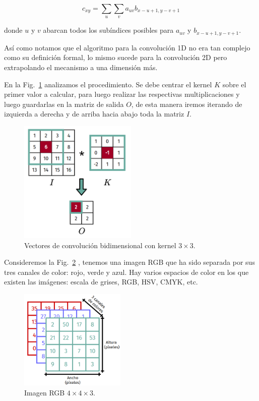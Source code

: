 \documentclass[a4paper,12pt]{article}
\begin{document}
$$
c_{xy} = \sum_{u} \sum_{v} a_{uv} b_{x-u+1,y-v+1}
$$

donde $u$ y $v$ abarcan todos los subíndices posibles para $a_{uv}$ y $b_{x-u+1,y-v+1}$.

Así como notamos que el algoritmo para la convolución 1D no era tan complejo como su definición formal, lo mismo sucede para la convolución 2D pero extrapolando el mecanismo a una dimensión más.

En la Fig.~\ref{fig:conv2d} \citep{andrianaivo2019architecture} analizamos el procedimiento. Se debe centrar el kernel $K$ sobre el primer valor a calcular, para luego realizar las respectivas multiplicaciones y luego guardarlas en la matriz de salida $O$, de esta manera iremos iterando de izquierda a derecha y de arriba hacia abajo toda la matriz $I$.

\begin{figure}[H]
	\begin{center}				
		\includegraphics[width=0.5\textwidth]{convolution2d.png}
		\caption{Vectores de convolución bidimensional con kernel $3 \times 3$.}
		\label{fig:conv2d}
	\end{center}
\end{figure}

Consideremos la Fig.~\ref{fig:conv2dimg} \citep{Saha2020Oct}, tenemos una imagen RGB que ha sido separada por sus tres canales de color: rojo, verde y azul. Hay varios espacios de color en los que existen las imágenes: escala de grises, RGB, HSV, CMYK, etc.

\begin{figure}[H]
	\begin{center}				
		\includegraphics[width=0.45\textwidth]{imgrgb.png}
		\caption{Imagen RGB $4 \times 4 \times 3$.}
		\label{fig:conv2dimg}
	\end{center}
\end{figure}
\end{document}
